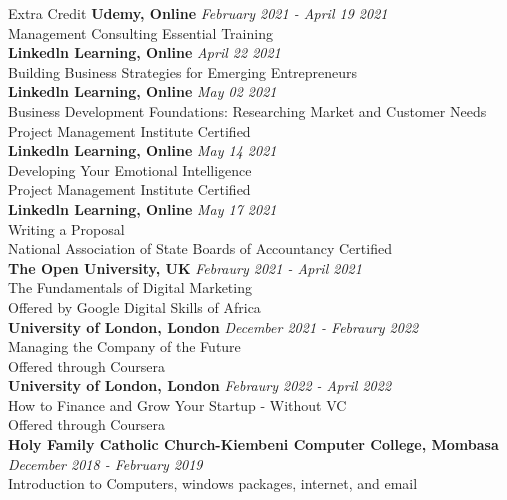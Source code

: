 \documentclass[
	11pt, %
]{resume} %
\begin{document}
\begin{rSection}{Extra Credit}
	\textbf{Udemy, Online} \hfill \textit{February 2021 - April 19 2021} \\
	Management Consulting Essential Training \\
	\textbf{Linkedln Learning, Online} \hfill \textit{April 22 2021} \\
	Building Business Strategies for Emerging Entrepreneurs \\	
	\textbf{Linkedln Learning, Online} \hfill \textit{May 02 2021} \\
	Business Development Foundations: Researching Market and Customer Needs \\
	Project Management Institute Certified \\	
	\textbf{Linkedln Learning, Online} \hfill \textit{May 14 2021} \\
	Developing Your Emotional Intelligence \\
	Project Management Institute Certified \\
	\textbf{Linkedln Learning, Online} \hfill \textit{May 17 2021} \\
	Writing a Proposal \\
	National Association of State Boards of Accountancy Certified \\
	\textbf{The Open University, UK} \hfill \textit{Febraury 2021 - April 2021} \\ 
	The Fundamentals of Digital Marketing \\
	Offered by Google Digital Skills of Africa \\
	\textbf{University of London, London} \hfill \textit{December 2021 - Febraury 2022} \\ 
	Managing the Company of the Future \\
	Offered through Coursera \\
	\textbf{University of London, London} \hfill \textit{Febraury 2022 - April 2022} \\ 
	How to Finance and Grow Your Startup - Without VC \\
	Offered through Coursera \\
	\textbf{Holy Family Catholic Church-Kiembeni Computer College, Mombasa} \hfill \textit{December 2018 - February 2019} \\ 
	Introduction to Computers, windows packages, internet, and email \\
\end{rSection}
\end{document}
